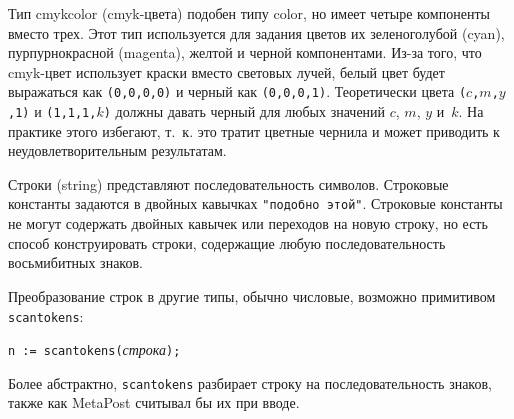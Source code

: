 \documentclass{article} %
\begin{document}
Тип cmykcolor (cmyk-цвета) подобен типу color, но 
имеет четыре компоненты вместо трех.
Этот тип используется для задания цветов их зеленоголубой (cyan), 
пурпурнокрасной (magenta), желтой и черной компонентами.
Из-за того, что cmyk-цвет использует краски вместо световых лучей, белый 
цвет будет выражаться как {\tt (0,0,0,0)} и черный как {\tt (0,0,0,1)}.
Теоретически цвета {\tt ($c$,$m$,$y$,1)} и {\tt (1,1,1,$k$)} должны давать черный 
для любых значений $c$, $m$, $y$ и~$k$.
На практике этого избегают, т.~к. это тратит цветные чернила и может приводить к 
неудовлетворительным результатам.

Строки (string) представляют последовательность символов.
Строковые константы задаются в двойных кавычках
\hbox{\verb|"подобно этой"|}.
Строковые константы не могут содержать двойных кавычек или переходов на новую 
строку, но есть способ конструировать строки, содержащие любую 
последовательность восьмибитных знаков.

\label{Dscantokens}
Преобразование строк в другие типы, обычно числовые, возможно примитивом 
{\tt scantokens}:
\begin{center}\texttt{n := scantokens(}\textit{строка}\texttt{);}\end{center}
Более абстрактно, \texttt{scantokens} разбирает строку на последовательность 
знаков, также как MetaPost считывал бы их при вводе.
\end{document}
